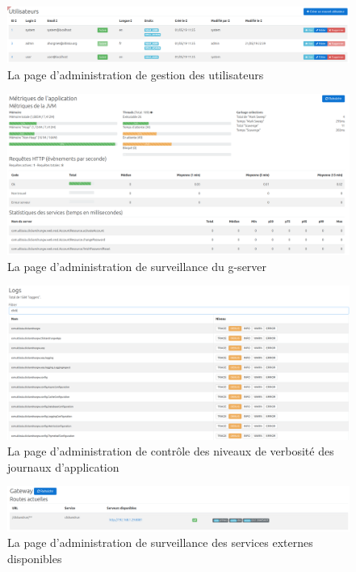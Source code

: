 \begin{figure}[ht]
    \centering
    \includegraphics[width=1\textwidth]{images/screenshot/admin-users.png}
    \caption{La page d'administration de gestion des utilisateurs}
\end{figure}

\begin{figure}[ht]
    \centering
    \includegraphics[width=1\textwidth]{images/screenshot/admin-metrics.png}
    \caption{La page d'administration de surveillance du \gls{g-server}}
\end{figure}

\begin{figure}[ht]
    \centering
    \includegraphics[width=1\textwidth]{images/screenshot/admin-logs.png}
    \caption{La page d'administration de contrôle des niveaux de verbosité des journaux d'application}
\end{figure}

\begin{figure}[ht]
    \centering
    \includegraphics[width=1\textwidth]{images/screenshot/admin-gateway.png}
    \caption{La page d'administration de surveillance des services externes disponibles}
\end{figure}

